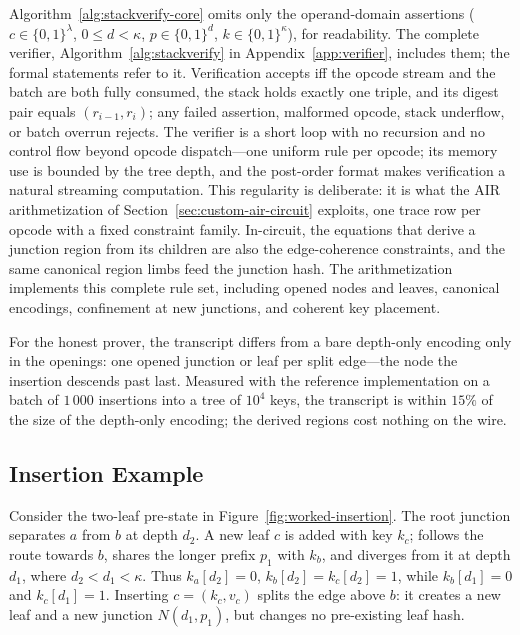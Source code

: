 \documentclass[twocolumn]{article}
\begin{document}
Algorithm~\ref{alg:stackverify-core} omits only the operand-domain assertions ($c \in \{0,1\}^{\lambda}$, $0 \le d < \kappa$, $p \in \{0,1\}^{d}$, $k \in \{0,1\}^{\kappa}$), for readability. The complete verifier, Algorithm~\ref{alg:stackverify} in Appendix~\ref{app:verifier}, includes them; the formal statements refer to it. Verification accepts iff the opcode stream and the batch are both fully consumed, the stack holds exactly one triple, and its digest pair equals $(r_{i-1}, r_i)$; any failed assertion, malformed opcode, stack underflow, or batch overrun rejects. The verifier is a short loop with no recursion and no control flow beyond opcode dispatch---one uniform rule per opcode; its memory use is bounded by the tree depth, and the post-order format makes verification a natural streaming computation. This regularity is deliberate: it is what the AIR arithmetization of Section~\ref{sec:custom-air-circuit} exploits, one trace row per opcode with a fixed constraint family. In-circuit, the equations that derive a junction region from its children are also the edge-coherence constraints, and the same canonical region limbs feed the junction hash. The arithmetization implements this complete rule set, including opened nodes and leaves, canonical encodings, confinement at new junctions, and coherent key placement.

For the honest prover, the transcript differs from a bare depth-only encoding only in the openings: one opened junction or leaf per split edge---the node the insertion descends past last. Measured with the reference implementation on a batch of $1\,000$ insertions into a tree of $10^4$ keys, the transcript is within $15\%$ of the size of the depth-only encoding; the derived regions cost nothing on the wire.


\subsection{Insertion Example}
\label{sec:worked-insertion}

Consider the two-leaf pre-state in Figure~\ref{fig:worked-insertion}. The root junction separates $a$ from $b$ at depth $d_2$. A new leaf $c$ is added with key $k_c$; follows the route towards $b$, shares the longer prefix $p_1$ with $k_b$, and diverges from it at depth $d_1$, where $d_2<d_1<\kappa$. Thus $k_a[d_2]=0$, $k_b[d_2]=k_c[d_2]=1$, while $k_b[d_1]=0$ and $k_c[d_1]=1$. Inserting $c=(k_c,v_c)$ splits the edge above $b$: it creates a new leaf and a new junction $N(d_1,p_1)$, but changes no pre-existing leaf hash.
\end{document}
